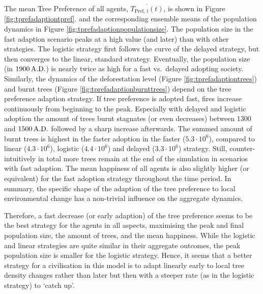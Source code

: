 The mean Tree Preference of all agents, $\overline{T_\text{Pref, i}(t)}$, is shown in Figure \ref{fig:tprefadaptiontpref}.
and the corresponding ensemble means of the population dynamics in Figure \ref{fig:tprefadaptionpopulationsize}.
The population size in the fast adaption scenario peaks at a high value (and later) than with other strategies.
The logistic strategy first follows the curve of the  delayed strategy, but then converges to the linear, standard strategy.
Eventually, the population size (in $1900\, {\rm A.D.}$) is nearly twice as high for a fast vs.\ delayed adopting society.
Similarly, the dynamics of the deforestation level (Figure \ref{fig:tprefadaptiontrees}) and burnt trees (Figure \ref{fig:tprefadaptionburnttrees}) depend on the tree preference adaption strategy. 
If tree preference is adopted fast, fires increase continuously from beginning to the peak. 
Especially with delayed and logistic adoption the amount of trees burnt stagnates (or even decreases) between $1300$ and $1500\,{\rm A.D.}$ followed by a sharp increase afterwards.
The summed amount of burnt trees is highest in the faster adoption in the faster ($5.3\cdot 10^6$), compared to linear ($4.3\cdot 10^6$), logistic ($4.4\cdot 10^6$) and delayed ($3.3\cdot 10^6$) strategy.
Still, counter-intuitively in total more trees remain at the end of the simulation in scenarios with fast adaption.
The mean happiness of all agents is also slightly higher (or equivalent) for the fast adoption strategy throughout the time period.
In summary, the specific shape of the adaption of the tree preference to local environmental change has a non-trivial influence on the aggregate dynamics.

Therefore, a fast decrease (or early adaption) of the tree preference seems to be the best strategy for the agents in all aspects, maximising the peak and final population size, the amount of trees, and the mean happiness.
While the logistic and linear strategies are quite similar in their aggregate outcomes, the peak population size is smaller for the logistic strategy.
Hence, it seems that a better strategy for a civilisation in this model is to adapt linearly early to local tree density changes rather than later but then  with a steeper rate (as in the logistic strategy) to `catch up'.

